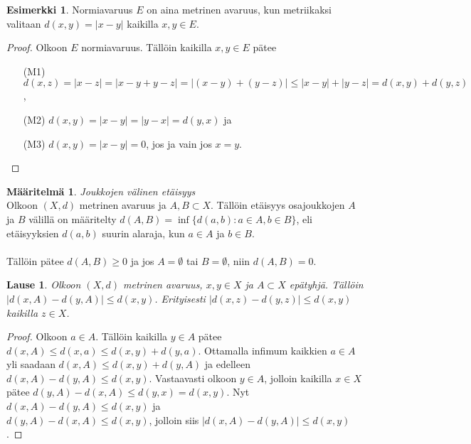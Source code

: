 \documentclass[12pt,a4paper,leqno]{report}
\theoremstyle{plain}
\newtheorem{lause}[equation]{Lause}
\theoremstyle{definition}
\newtheorem{maar}[equation]{Määritelmä}
\newtheorem{esim}[equation]{Esimerkki}
\theoremstyle{remark}
\begin{document}
\begin{esim}
Normiavaruus $E$ on aina metrinen avaruus, kun metriikaksi valitaan $d(x,y)=|x-y|$ kaikilla $x,y\in E$. 

\begin{proof}
Olkoon $E$ normiavaruus. 
Tällöin kaikilla $x,y\in E$ pätee
\begin{itemize}
\item[(M1)]%
$d(x,z)=|x-z|=|x-y+y-z|=|(x-y)+(y-z)|\leq|x-y|+|y-z|=d(x,y)+d(y,z)$,
\item[(M2)]$d(x,y)=|x-y|=|y-x|=d(y,x)$ ja
\item[(M3)]$d(x,y)=|x-y|=0$, jos ja vain jos $x=y$.
\end{itemize}
\end{proof}

\end{esim}
\begin{maar}\emph{Joukkojen välinen etäisyys}\\
Olkoon $(X,d)$ metrinen avaruus ja $A,B\subset X$. Tällöin etäisyys osajoukkojen $A$ ja $B$ välillä on määritelty $d(A,B)=\inf\{d(a,b)\colon a\in A, b\in B\}$, eli etäisyyksien $d(a,b)$ suurin alaraja, kun $a\in A$ ja $b\in B$. \\
\\
Tällöin pätee $d(A,B)\geq 0$ ja jos $A= \emptyset$ tai $B= \emptyset$, niin $d(A,B)= 0$. 

\end{maar}
\begin{lause}
Olkoon $(X,d)$ metrinen avaruus, $x,y\in X$ ja $A\subset X$ epätyhjä. Tällöin $|d(x,A)-d(y,A)|\leq d(x,y)$. Erityisesti $|d(x,z)-d(y,z)|\leq d(x,y)$ kaikilla $z\in X$.
\end{lause}

\begin{proof}
Olkoon $a\in A$. Tällöin kaikilla $y\in A$ pätee ${d(x,A)\leq d(x,a)\leq d(x,y)+d(y,a)}$. Ottamalla infimum kaikkien $a\in A$ yli saadaan $d(x,A)\leq d(x,y)+d(y,A)$
ja edelleen $d(x,A)-d(y,A)\leq d(x,y) $.
Vastaavasti olkoon $y\in A$, jolloin kaikilla $x\in X$ pätee ${d(y,A)-d(x,A)\leq d(y,x)=d(x,y) }$. 
Nyt $d(x,A)-d(y,A)\leq d(x,y) $ ja\\ ${d(y,A)-d(x,A)\leq d(x,y) }$, jolloin siis $|d(x,A)-d(y,A)|\leq d(x,y) $.

\end{proof}
\end{document}
